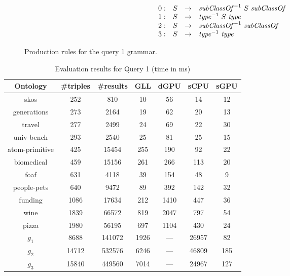 \begin{figure}[h]
   \[
\begin{array}{rccl}
   0: & S & \rightarrow & \text{\textit{subClassOf}}^{-1} \ S \ \text{\textit{subClassOf}} \\ 
   1: & S & \rightarrow & \text{\textit{type}}^{-1} \ S \ \text{\textit{type}} \\ 
   2: & S & \rightarrow & \text{\textit{subClassOf}}^{-1} \ \text{\textit{subClassOf}} \\ 
   3: & S & \rightarrow & \text{\textit{type}}^{-1} \ \text{\textit{type}} \\ 
\end{array}
\]
\caption{Production rules for the query 1 grammar.}
\label{ProductionRulesQuery1}
\end{figure}

\begin{table*}[ht]
\centering
\caption{Evaluation results for Query 1 (time in ms)}
\label{tbl1}

\begin{tabular}{ | c | c | c | c | c | c | c |}
\hline
Ontology & \#triples & \#results & GLL & dGPU & sCPU & sGPU \\
\hline 
\hline
skos        & 252 & 810 & 10 & 56 & 14 & 12\\
generations & 273 & 2164 & 19 & 62 & 20 & 13\\
travel      & 277 & 2499 & 24 & 69 & 22 & 30\\
univ-bench  & 293 & 2540 & 25 & 81 & 25 & 15\\
atom-primitive & 425 & 15454 & 255 & 190 & 92 & 22\\
biomedical & 459 & 15156 & 261 & 266 & 113 & 20\\
foaf        & 631 & 4118 & 39 & 154 & 48 & 9\\
people-pets & 640 & 9472 & 89 & 392 & 142 & 32\\
funding     & 1086 & 17634 & 212 & 1410 & 447 & 36\\
wine        & 1839 & 66572 & 819 & 2047 & 797 & 54\\
pizza       & 1980 & 56195 & 697 & 1104 & 430 & 24\\
$g_{1}$     & 8688 & 141072 & 1926 & --- & 26957 & 82\\
$g_{2}$     & 14712 & 532576 & 6246 & --- & 46809 & 185\\
$g_{3}$     & 15840 & 449560 & 7014 & --- & 24967 & 127\\
\hline
\end{tabular}

\end{table*}

